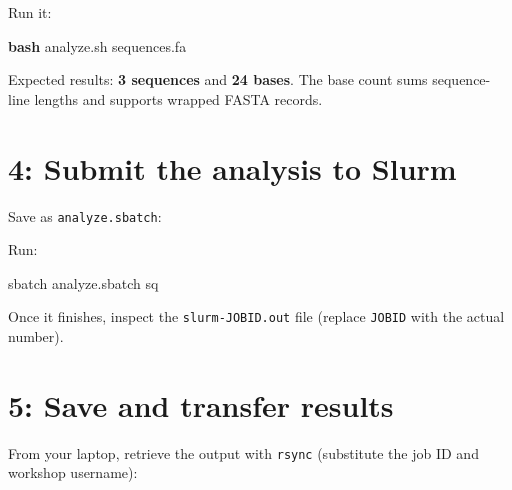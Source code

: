 \documentclass[
]{book}
\newenvironment{Shaded}{\begin{snugshade}}{\end{snugshade}}
\newcommand{\AttributeTok}[1]{\textcolor[rgb]{0.13,0.29,0.53}{#1}}
\newcommand{\BuiltInTok}[1]{#1}
\newcommand{\CommentTok}[1]{\textcolor[rgb]{0.56,0.35,0.01}{\textit{#1}}}
\newcommand{\ExtensionTok}[1]{#1}
\newcommand{\FunctionTok}[1]{\textcolor[rgb]{0.13,0.29,0.53}{\textbf{#1}}}
\newcommand{\NormalTok}[1]{#1}
\newcommand{\StringTok}[1]{\textcolor[rgb]{0.31,0.60,0.02}{#1}}
\newcommand{\VariableTok}[1]{\textcolor[rgb]{0.00,0.00,0.00}{#1}}
\begin{document}
Run it:

\begin{Shaded}
\begin{Highlighting}[]
\FunctionTok{bash}\NormalTok{ analyze.sh sequences.fa}
\end{Highlighting}
\end{Shaded}

Expected results: \textbf{3 sequences} and \textbf{24 bases}. The base count sums sequence-line lengths and supports wrapped FASTA records.

\section{4: Submit the analysis to Slurm}\label{submit-the-analysis-to-slurm}

Save as \texttt{analyze.sbatch}:

\begin{Shaded}
\end{Shaded}

Run:

\begin{Shaded}
\begin{Highlighting}[]
\ExtensionTok{sbatch}\NormalTok{ analyze.sbatch}
\ExtensionTok{sq}
\end{Highlighting}
\end{Shaded}

Once it finishes, inspect the \texttt{slurm-JOBID.out} file (replace \texttt{JOBID} with the actual number).

\section{5: Save and transfer results}\label{save-and-transfer-results}

From your laptop, retrieve the output with \texttt{rsync} (substitute the job ID and workshop username):
\end{document}
